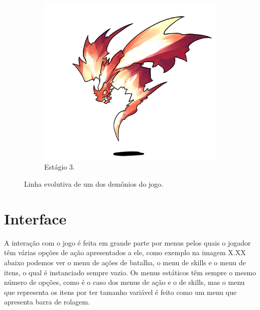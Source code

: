\documentclass[
	12pt,				%
	openright,			%
	twoside,			%
	a4paper,			%
	english,			%
	french,				%
	spanish,			%
	brazil				%
	]{abntex2}
\begin{document}
\begin{figure}[h!]
\begin{subfigure}[b]{0.45\linewidth}
    \includegraphics[width=\linewidth]{stage3.png}
    \caption{Estágio 3.}
  \end{subfigure}
  \caption{Linha evolutiva de um dos demônios do jogo.}
  \label{fig:evolution}
\end{figure}

\section{Interface}

A interação com o jogo é feita em grande parte por menus pelos quais o jogador têm várias opções de ação apresentados a ele, como exemplo na imagem X.XX abaixo podemos ver o menu de ações de batalha, o menu de skills e o menu de itens, o qual é instanciado sempre vazio. Os menus estáticos têm sempre o mesmo número de opções, como é o caso dos menus de ação e o de skills, mas o menu que representa os itens por ter tamanho variável é feito como um menu que apresenta barra de rolagem.
\end{document}
